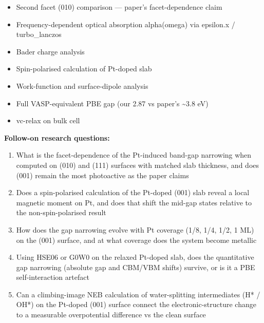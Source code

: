 \begin{itemize}[leftmargin=1.4em,itemsep=0.2em,topsep=0.2em]
\item Second facet (010) comparison --- paper's facet-dependence claim
\item Frequency-dependent optical absorption alpha(omega) via epsilon.x / turbo\_lanczos
\item Bader charge analysis
\item Spin-polarised calculation of Pt-doped slab
\item Work-function and surface-dipole analysis
\item Full VASP-equivalent PBE gap (our 2.87 vs paper's \textasciitilde{}3.8 eV)
\item vc-relax on bulk cell
\end{itemize}\noindent\textbf{Follow-on research questions:}
\begin{enumerate}[leftmargin=1.6em,itemsep=0.2em,topsep=0.2em,label=Q\arabic*.]
\item What is the facet-dependence of the Pt-induced band-gap narrowing when computed on (010) and (111) surfaces with matched slab thickness, and does (001) remain the most photoactive as the paper claims
\item Does a spin-polarised calculation of the Pt-doped (001) slab reveal a local magnetic moment on Pt, and does that shift the mid-gap states relative to the non-spin-polarised result
\item How does the gap narrowing evolve with Pt coverage (1/8, 1/4, 1/2, 1 ML) on the (001) surface, and at what coverage does the system become metallic
\item Using HSE06 or G0W0 on the relaxed Pt-doped slab, does the quantitative gap narrowing (absolute gap and CBM/VBM shifts) survive, or is it a PBE self-interaction artefact
\item Can a climbing-image NEB calculation of water-splitting intermediates (H* / OH*) on the Pt-doped (001) surface connect the electronic-structure change to a measurable overpotential difference vs the clean surface
\end{enumerate}

